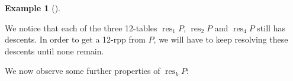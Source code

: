 \documentclass[numbers=enddot,12pt,final,onecolumn,notitlepage]{scrartcl}%
\theoremstyle{definition}
\newtheorem{exmp}[theo]{Example}
\newenvironment{example}[1][]
{\begin{exmp}[#1]\begin{leftbar}}
{\end{leftbar}\end{exmp}}
\begin{document}
\begin{example}
\begin{comment}
\end{comment}

We notice that each of the three 12-tables $\operatorname*{res}\nolimits_{1}%
P$, $\operatorname*{res}\nolimits_{2}P$ and $\operatorname*{res}%
\nolimits_{4}P$ still has descents. In order to get a 12-rpp from
$P$, we will have to keep resolving these descents until none remain.
\end{example}


We now observe some further properties of $\operatorname*{res}\nolimits_{k}P$:
\end{document}
